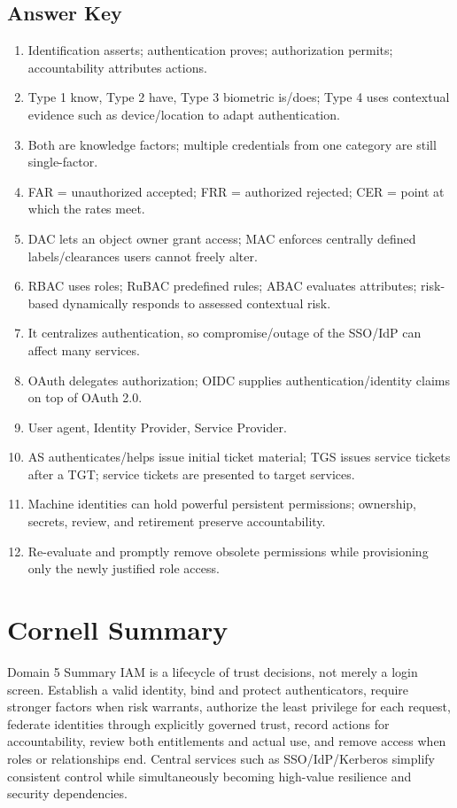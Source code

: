 \documentclass[10pt,letterpaper]{article}
\begin{document}
\subsection*{Answer Key}
\begin{enumerate}
\item Identification asserts; authentication proves; authorization permits; accountability attributes actions.
\item Type 1 know, Type 2 have, Type 3 biometric is/does; Type 4 uses contextual evidence such as device/location to adapt authentication.
\item Both are knowledge factors; multiple credentials from one category are still single-factor.
\item FAR = unauthorized accepted; FRR = authorized rejected; CER = point at which the rates meet.
\item DAC lets an object owner grant access; MAC enforces centrally defined labels/clearances users cannot freely alter.
\item RBAC uses roles; RuBAC predefined rules; ABAC evaluates attributes; risk-based dynamically responds to assessed contextual risk.
\item It centralizes authentication, so compromise/outage of the SSO/IdP can affect many services.
\item OAuth delegates authorization; OIDC supplies authentication/identity claims on top of OAuth 2.0.
\item User agent, Identity Provider, Service Provider.
\item AS authenticates/helps issue initial ticket material; TGS issues service tickets after a TGT; service tickets are presented to target services.
\item Machine identities can hold powerful persistent permissions; ownership, secrets, review, and retirement preserve accountability.
\item Re-evaluate and promptly remove obsolete permissions while provisioning only the newly justified role access.
\end{enumerate}

\section{Cornell Summary}
\begin{summarybox}{Domain 5 Summary}
IAM is a lifecycle of trust decisions, not merely a login screen. Establish a valid identity, bind and protect authenticators, require stronger factors when risk warrants, authorize the least privilege for each request, federate identities through explicitly governed trust, record actions for accountability, review both entitlements and actual use, and remove access when roles or relationships end. Central services such as SSO/IdP/Kerberos simplify consistent control while simultaneously becoming high-value resilience and security dependencies.
\end{summarybox}
\end{document}

